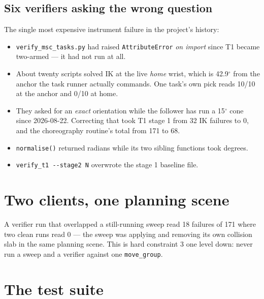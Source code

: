 \documentclass[11pt,a4paper,oneside]{report}
\newcommand{\code}[1]{\texttt{\small #1}}
\newcommand{\file}[1]{\texttt{\small #1}}
\newcommand{\dg}{$^{\circ}$}
\begin{document}
\subsection{Six verifiers asking the wrong question}

The single most expensive instrument failure in the project's history:

\begin{itemize}
\item \file{verify\_msc\_tasks.py} had raised \code{AttributeError} \emph{on
      import} since T1 became two-armed --- it had not run at all.
\item About twenty scripts solved IK at the live \emph{home} wrist, which is
      42.9\dg{} from the anchor the task runner actually commands. One task's
      own pick reads 10/10 at the anchor and 0/10 at home.
\item They asked for an \emph{exact} orientation while the follower has run a
      15\dg{} cone since 2026-08-22. Correcting that took T1 stage 1 from 32 IK
      failures to 0, and the choreography routine's total from 171 to 68.
\item \code{normalise()} returned radians while its two sibling functions took
      degrees.
\item \code{verify\_t1 -{}-stage2 N} overwrote the stage 1 baseline file.
\end{itemize}

\section{Two clients, one planning scene}

A verifier run that overlapped a still-running sweep read 18 failures of 171
where two clean runs read 0 --- the sweep was applying and removing its own
collision slab in the same planning scene. This is hard constraint 3 one level
down: never run a sweep and a verifier against one \code{move\_group}.

\section{The test suite}
\end{document}
